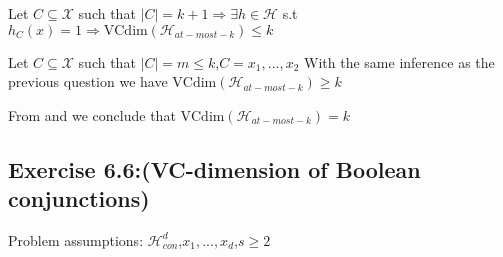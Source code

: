 \documentclass[]{book}
\begin{document}
\begin{enumerate}
    Let $C \subseteq \mathcal{X}$ such that $|C|=k+1 \Rightarrow \exists h\in \mathcal{H}$ s.t $h_C(x)=1 \Rightarrow \text{VCdim}(\mathcal{H}_{at-most-k})\leq k$ \hspace{1cm} 
    
    Let $C \subseteq \mathcal{X}$ such that $|C|=m\leq k$,$C={x_1,...,x_2}$ With the same inference as the previous question we have $\text{VCdim}(\mathcal{H}_{at-most-k})\geq k$\hspace{1cm} 
    
    From  and  we conclude that $\text{VCdim}(\mathcal{H}_{at-most-k})= k$
    
\end{enumerate}

\subsection*{Exercise 6.6:(VC-dimension of Boolean conjunctions)}
Problem assumptions: $\mathcal{H}^d_{con}$\hspace{1cm},\hspace{1cm}$x_1,...,x_d$\hspace{1cm},\hspace{1cm}$s\geq 2$
\end{document}
